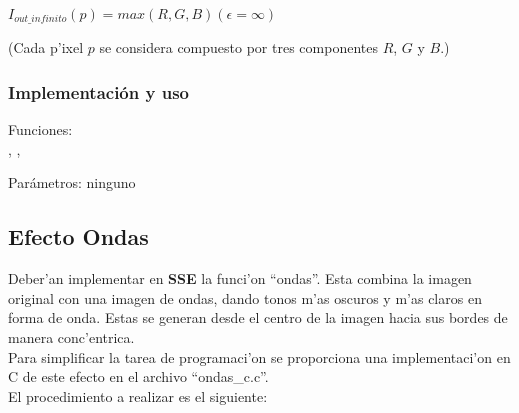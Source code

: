 \begin{center}
  $I_{out\_infinito}(p) = max(R, G, B) (\epsilon = \infty)$
\end{center}

(Cada p'ixel $p$ se considera compuesto por tres componentes $R$, $G$ y $B$.)

\subsubsection*{Implementación y uso}
\noindent Funciones: \\
, ,
 
\noindent Parámetros: ninguno




\subsection{Efecto Ondas}

Deber'an implementar en \textbf{SSE} la funci'on ``ondas''. Esta combina la 
imagen original con una imagen de ondas, dando tonos m'as oscuros y m'as claros 
en forma de onda. Estas se generan desde el centro de la imagen hacia 
sus bordes de manera conc'entrica.\\

Para simplificar la tarea de programaci'on se proporciona una implementaci'on 
en C de este efecto en el archivo ``ondas\_c.c''.\\

El procedimiento a realizar es el siguiente:

